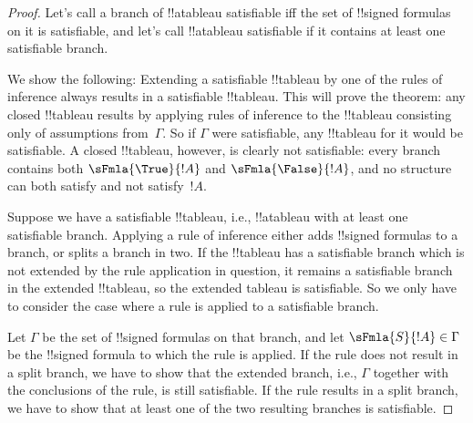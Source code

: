 \begin{proof}
Let's call a branch of !!a{tableau} satisfiable iff the set of
!!{signed formula}s on it is satisfiable, and let's call !!a{tableau}
satisfiable if it contains at least one satisfiable branch.

We show the following: Extending a satisfiable !!{tableau} by one of
the rules of inference always results in a satisfiable !!{tableau}.
This will prove the theorem: any closed !!{tableau} results by
applying rules of inference to the !!{tableau} consisting only of
assumptions from~$\Gamma$. So if $\Gamma$ were satisfiable, any
!!{tableau} for it would be satisfiable. A closed !!{tableau},
however, is clearly not satisfiable: every branch contains both
$\sFmla{\True}{!A}$ and $\sFmla{\False}{!A}$, and no structure can
both satisfy and not satisfy~$!A$.

Suppose we have a satisfiable !!{tableau}, i.e., !!a{tableau} with at
least one satisfiable branch. Applying a rule of inference either adds
!!{signed formula}s to a branch, or splits a branch in two. If the
!!{tableau} has a satisfiable branch which is not extended by the rule
application in question, it remains a satisfiable branch in the
extended !!{tableau}, so the extended tableau is satisfiable. So we
only have to consider the case where a rule is applied to a
satisfiable branch.

Let $\Gamma$ be the set of !!{signed formula}s on that branch, and
let $\sFmla{S}{!A} \in \Gamma$ be the !!{signed formula} to which the
rule is applied. If the rule does not result in a split branch, we
have to show that the extended branch, i.e., $\Gamma$ together with
the conclusions of the rule, is still satisfiable. If the rule results
in a split branch, we have to show that at least one of the two
resulting branches is satisfiable.
  

\end{proof}
